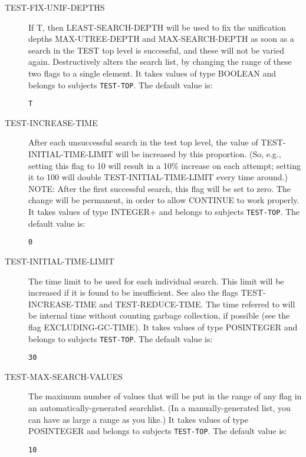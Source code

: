 \begin{description}
\item[TEST-FIX-UNIF-DEPTHS]  
If T, then LEAST-SEARCH-DEPTH will be used to fix the unification depths
MAX-UTREE-DEPTH and MAX-SEARCH-DEPTH as soon as a search in the TEST top 
level is successful, and these will not be varied again. Destructively 
alters the search list, by changing the range of these two flags to a 
single element.
It takes values of type BOOLEAN and belongs to subjects \texttt{TEST-TOP}.  The default value is: \begin{lstlisting}
T
\end{lstlisting}

\item[TEST-INCREASE-TIME]  
After each unsuccessful search in the test top level,
the value of TEST-INITIAL-TIME-LIMIT will be increased by this 
proportion. (So, e.g., setting this flag to 10 will result in a 10\%  
increase on each attempt; setting it to 100 will double 
TEST-INITIAL-TIME-LIMIT every time around.)
NOTE: After the first successful search, this flag will be set to
zero. The change will be permanent, in order to allow CONTINUE to
work properly.
It takes values of type INTEGER+ and belongs to subjects \texttt{TEST-TOP}.  The default value is: \begin{lstlisting}
0
\end{lstlisting}

\item[TEST-INITIAL-TIME-LIMIT]  
The time limit to be used for each individual search. This
limit will be increased if it is found to be insufficient. See 
also the flags TEST-INCREASE-TIME and TEST-REDUCE-TIME. 
The time referred to will be internal time without counting 
garbage collection, if possible (see the flag EXCLUDING-GC-TIME).
It takes values of type POSINTEGER and belongs to subjects \texttt{TEST-TOP}.  The default value is: \begin{lstlisting}
30
\end{lstlisting}

\item[TEST-MAX-SEARCH-VALUES]  
The maximum number of values that will be put in the
range of any flag in an automatically-generated searchlist.
(In a manually-generated list, you can have as large a range
as you like.)
It takes values of type POSINTEGER and belongs to subjects \texttt{TEST-TOP}.  The default value is: \begin{lstlisting}
10
\end{lstlisting}


\end{description}

